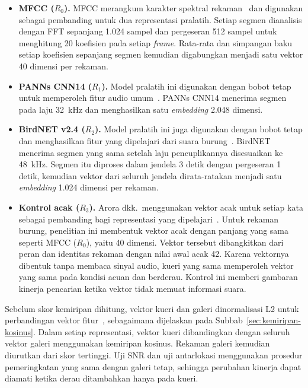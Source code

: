 \begin{itemize}
    \item \textbf{MFCC ($R_0$).} MFCC merangkum karakter spektral rekaman~\cite{peng2025birdfbank,davis1980mfcc} dan digunakan sebagai pembanding untuk dua representasi pralatih. Setiap segmen dianalisis dengan FFT sepanjang 1.024 sampel dan pergeseran 512 sampel untuk menghitung 20 koefisien pada setiap \textit{frame}. Rata-rata dan simpangan baku setiap koefisien sepanjang segmen kemudian digabungkan menjadi satu vektor 40 dimensi per rekaman.
    \item \textbf{PANNs CNN14 ($R_1$).} Model pralatih ini digunakan dengan bobot tetap untuk memperoleh fitur audio umum~\cite{kong2020panns}. PANNs CNN14 menerima segmen pada laju 32~kHz dan menghasilkan satu \textit{embedding} 2.048 dimensi.
    \item \textbf{BirdNET v2.4 ($R_2$).} Model pralatih ini juga digunakan dengan bobot tetap dan menghasilkan fitur yang dipelajari dari suara burung~\cite{allenankins2025retrieval,kahl2021birdnet}. BirdNET menerima segmen yang sama setelah laju pencuplikannya disesuaikan ke 48~kHz. Segmen itu diproses dalam jendela 3 detik dengan pergeseran 1 detik, kemudian vektor dari seluruh jendela dirata-ratakan menjadi satu \textit{embedding} 1.024 dimensi per rekaman.
    \item \textbf{Kontrol acak ($R_3$).} Arora dkk.\ menggunakan vektor acak untuk setiap kata sebagai pembanding bagi representasi yang dipelajari~\cite{arora2020random}. Untuk rekaman burung, penelitian ini membentuk vektor acak dengan panjang yang sama seperti MFCC ($R_0$), yaitu 40 dimensi. Vektor tersebut dibangkitkan dari peran dan identitas rekaman dengan nilai awal acak 42. Karena vektornya dibentuk tanpa membaca sinyal audio, kueri yang sama memperoleh vektor yang sama pada kondisi acuan dan berderau. Kontrol ini memberi gambaran kinerja pencarian ketika vektor tidak memuat informasi suara.
\end{itemize}

Sebelum skor kemiripan dihitung, vektor kueri dan galeri dinormalisasi L2 untuk perbandingan vektor fitur~\cite{musgrave2020metric}, sebagaimana dijelaskan pada Subbab~\ref{sec:kemiripan-kosinus}. Dalam setiap representasi, vektor kueri dibandingkan dengan seluruh vektor galeri menggunakan kemiripan kosinus. Rekaman galeri kemudian diurutkan dari skor tertinggi. Uji SNR dan uji antarlokasi menggunakan prosedur pemeringkatan yang sama dengan galeri tetap, sehingga perubahan kinerja dapat diamati ketika derau ditambahkan hanya pada kueri.

